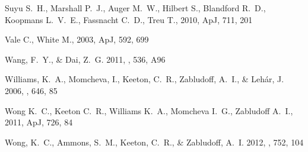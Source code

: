 \begin{thebibliography}{99}
Suyu S.~H., Marshall P.~J., Auger M.~W., Hilbert S., Blandford R.~D., 
Koopmans L.~V.~E., Fassnacht C.~D., Treu T., 2010, ApJ, 711, 201 


 Vale C., White M., 2003, ApJ, 592, 699 


{Wang}, F.~Y., \& {Dai}, Z.~G. 2011, \aap, 536, A96


{Williams}, K.~A., {Momcheva}, I., {Keeton}, C.~R., {Zabludoff}, A.~I., \&
  {Leh{\'a}r}, J. 2006, \apj, 646, 85


Wong K.~C., Keeton C.~R., Williams K.~A., Momcheva I.~G., Zabludoff A.~I., 
2011, ApJ, 726, 84 


{Wong}, K.~C., {Ammons}, S.~M., {Keeton}, C.~R., \& {Zabludoff}, A.~I. 2012,
  \apj, 752, 104


\end{thebibliography}

